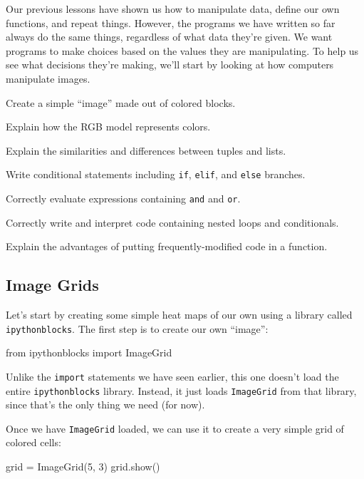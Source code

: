 \documentclass{book}
\begin{document}
Our previous lessons have shown us how to manipulate data, define our
own functions, and repeat things. However, the programs we have written
so far always do the same things, regardless of what data they're given.
We want programs to make choices based on the values they are
manipulating. To help us see what decisions they're making, we'll start
by looking at how computers manipulate images.

\begin{objectives}
\begin{swcitemize}
\item
  Create a simple ``image'' made out of colored blocks.
\item
  Explain how the RGB model represents colors.
\item
  Explain the similarities and differences between tuples and lists.
\item
  Write conditional statements including \texttt{if}, \texttt{elif}, and
  \texttt{else} branches.
\item
  Correctly evaluate expressions containing \texttt{and} and
  \texttt{or}.
\item
  Correctly write and interpret code containing nested loops and
  conditionals.
\item
  Explain the advantages of putting frequently-modified code in a
  function.
\end{swcitemize}
\end{objectives}

\subsection{Image Grids}

Let's start by creating some simple heat maps of our own using a library
called \texttt{ipythonblocks}. The first step is to create our own
``image'':

\begin{VerbIn}
from ipythonblocks import ImageGrid
\end{VerbIn}

Unlike the \texttt{import} statements we have seen earlier, this one
doesn't load the entire \texttt{ipythonblocks} library. Instead, it just
loads \texttt{ImageGrid} from that library, since that's the only thing
we need (for now).

Once we have \texttt{ImageGrid} loaded, we can use it to create a very
simple grid of colored cells:

\begin{VerbIn}
grid = ImageGrid(5, 3)
grid.show()
\end{VerbIn}
\end{document}
